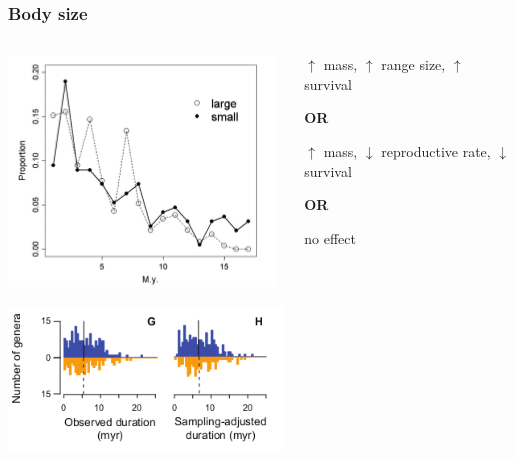\documentclass{beamer}
\begin{document}
\begin{frame}
  \frametitle{Body size}
  \begin{columns}
    \begin{column}{0.5\textwidth}
      \includegraphics[height=0.4\textheight,width=\textwidth,keepaspectratio=true]{figure/liowmam}

      \includegraphics[height=0.4\textheight,width=\textwidth,keepaspectratio=true]{figure/susumu}
    \end{column}
    \begin{column}{0.5\textwidth}
      \(\uparrow\) mass, \(\uparrow\) range size, \(\uparrow\) survival

      \vspace{0.3cm}

      \textbf{OR}

      \vspace{0.3cm}

      \(\uparrow\) mass, \(\downarrow\) reproductive rate, \(\downarrow\) survival

      \vspace{0.3cm}

      \textbf{OR}

      \vspace{0.3cm}

      no effect

    \end{column}
  \end{columns}
\end{frame}
\end{document}
